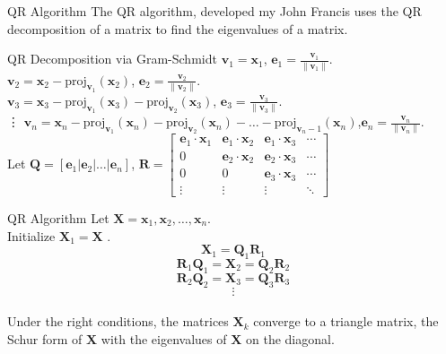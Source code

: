 \documentclass{beamer}
\begin{document}
\begin{frame}{QR Algorithm}
The QR algorithm, developed my John Francis uses the QR decomposition of a matrix to find the eigenvalues of a matrix.

\begin{block}{QR Decomposition via Gram-Schmidt}
$\mathbf{v}_1= \mathbf{x}_1$, $\mathbf{e}_1 = \frac{\mathbf{v}_1}{\|\mathbf{v}_1\|}$.
\\
$\mathbf{v}_2 = \mathbf{x}_2 - \text{proj}_{\mathbf{v}_1}(\mathbf{x}_2)$, $\mathbf{e}_2 = \frac{\mathbf{v}_2}{\|\mathbf{v}_2\|}$.
\\
$\mathbf{v}_3 = \mathbf{x}_3 - \text{proj}_{\mathbf{v}_1}(\mathbf{x}_3) - \text{proj}_{\mathbf{v}_2}(\mathbf{x}_3)$, $\mathbf{e}_3 = \frac{\mathbf{v}_3}{\|\mathbf{v}_3\|}$.
\\
\vdots
$\mathbf{v}_n = \mathbf{x}_n - \text{proj}_{\mathbf{v}_1}(\mathbf{x}_n) - \text{proj}_{\mathbf{v}_2}(\mathbf{x}_n)- \ldots - \text{proj}_{\mathbf{v}_n-1}(\mathbf{x}_n)$,$\mathbf{e}_n = \frac{\mathbf{v}_n}{\|\mathbf{v}_n\|}$.
\vspace{5pt}
\\
Let $\mathbf{Q} = [\mathbf{e}_1 | \mathbf{e}_2 | \ldots | \mathbf{e}_n]$,
$\mathbf{R} = \begin{bmatrix}
  \mathbf{e}_1 \cdot \mathbf{x}_1 &
  \mathbf{e}_1 \cdot \mathbf{x}_2 &
  \mathbf{e}_1 \cdot \mathbf{x}_3 & \cdots \\
                                         0 &
 \mathbf{e}_2 \cdot \mathbf{x}_2 &
 \mathbf{e}_2 \cdot \mathbf{x}_3& \cdots \\
                                         0 &
                                         0 &
  \mathbf{e}_3 \cdot \mathbf{x}_3& \cdots \\
                                    \vdots &
                                    \vdots &
                                    \vdots &
                                    \ddots\end{bmatrix}$
\end{block}
\end{frame}

\begin{frame}
\begin{block}{QR Algorithm}
Let $\mathbf{X} = \mathbf{x}_1, \mathbf{x}_2, \ldots, \mathbf{x}_n$.
\\
Initialize $\mathbf{X}_1 = \mathbf{X}$ .
$$\mathbf{X}_1 = \mathbf{Q}_1\mathbf{R}_1$$
$$\mathbf{R}_1\mathbf{Q}_1 = \mathbf{X}_2 = \mathbf{Q}_2\mathbf{R}_2$$
$$\mathbf{R}_2\mathbf{Q}_2 = \mathbf{X}_3 = \mathbf{Q}_3\mathbf{R}_3$$
$$\vdots$$
\\
Under the right conditions, the matrices $\mathbf{X}_k$ converge to a triangle matrix, the Schur form of $\mathbf{X}$ with the eigenvalues of $\mathbf{X}$ on the diagonal.
\end{block}
\end{frame}
\end{document}
